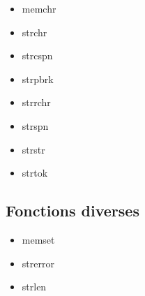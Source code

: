 \begin{itemize}
\item memchr
\item strchr
\item strcspn
\item strpbrk
\item strrchr
\item strspn
\item strstr
\item strtok
\end{itemize}

\subsection{Fonctions diverses}

\begin{itemize}
\item memset
\item strerror
\item strlen
\end{itemize}
